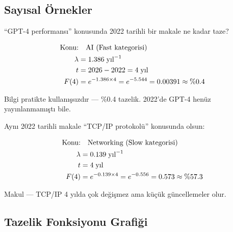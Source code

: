 \subsection{Say{\i}sal \"{O}rnekler}

\begin{ornek}
``GPT-4 performans{\i}'' konusunda 2022 tarihli bir makale ne kadar taze?

\begin{align}
\text{Konu:} &\quad \text{AI (Fast kategorisi)} \\
\lambda &= 1.386 \;\text{y{\i}l}^{-1} \\
t &= 2026 - 2022 = 4 \;\text{y{\i}l} \\
F(4) &= e^{-1.386 \times 4} = e^{-5.544} = 0.00391 \approx \%0.4
\end{align}

Bilgi pratikte kullan{\i}\c{s}s{\i}zd{\i}r --- \%0.4 tazelik. 2022'de GPT-4 hen\"{u}z yay{\i}nlanmam{\i}\c{s}t{\i} bile.
\end{ornek}

\begin{ornek}
Ayn{\i} 2022 tarihli makale ``TCP/IP protokol\"{u}'' konusunda olsun:

\begin{align}
\text{Konu:} &\quad \text{Networking (Slow kategorisi)} \\
\lambda &= 0.139 \;\text{y{\i}l}^{-1} \\
t &= 4 \;\text{y{\i}l} \\
F(4) &= e^{-0.139 \times 4} = e^{-0.556} = 0.573 \approx \%57.3
\end{align}

Makul --- TCP/IP 4 y{\i}lda \c{c}ok de\u{g}i\c{s}mez ama k\"{u}\c{c}\"{u}k g\"{u}ncellemeler olur.
\end{ornek}

\subsection{Tazelik Fonksiyonu Grafi\u{g}i}

